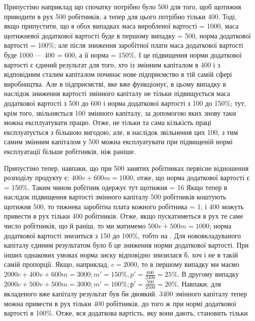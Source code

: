 
Припустімо наприклад що спочатку потрібно було 500 для того, щоб щотижня приводити в рух 500 робітників, а тепер для цього потрібно тільки
400.
Тоді, якщо припустити, що в обох випадках маса виробленої
вартості = 1000, маса щотижневої додаткової вартості буде в першому випадку = 500, норма додаткової вартості  = 100\%; але після зниження заробітної плати
маса додаткової вартості буде 1000 — 400 = 600, а її норма  = 150\%. І це підвищення норми додаткової вартості є єдиний результат
для того, хто із змінним капіталом в 400 і з відповідним сталим капіталом починає
нове підприємство в тій самій сфері виробництва. Але в підприємстві, яке вже функціонує, в цьому
випадку в наслідок зниження вартості змінного
капіталу не тільки підвищується маса додаткової вартості з 500
до 600 і норма додаткової вартості з 100
до 150\%; тут, крім того, звільняється 100
змінного капіталу, за допомогою яких знову таки можна експлуатувати працю. Отже, не тільки та сама
кількість праці експлуатується з більшою вигодою, але, в наслідок звільнення цих 100, з тим самим змінним капіталом у 500 можна експлуатувати при підвищеній
нормі експлуатації більше робітників, ніж раніше.

Припустімо тепер, навпаки, що при 500 занятих робітниках
первісне відношення розподілу продукту є: $400 v + 600 m = 1000$, отже, що норма додаткової вартості є = 150\%. Таким
чином робітник одержує тут щотижня  = 16 Якщо тепер в наслідок
підвищення вартості
змінного капіталу 500 робітників коштують щотижня 500, то тижнева заробітна плата кожного робітника = 1, і 400 можуть привести
в рух тільки 400 робітників. Отже, якщо пускатиметься в рух те
саме число робітників, що й раніш, то ми матимемо $500 v + 500 m = 1000$; норма додаткової вартості
знизиться з 150 до 100\%,
тобто на . Для нововкладуваного капіталу єдиним результатом було б це зниження норми додаткової
вартості. При інших
однакових умовах норма зиску відповідно знизилася б, хоч і не
в такій самій пропорції. Якщо, наприклад, $c = 2000$, то в
першому випадку ми маємо $2000 c + 400 v + 600 m = 3000; m' = 150\%, p' = \frac{600}{2400} = 25\%$. В другому
випадку $2000 c + 500 v + 500 m = 3000; m' = 100\%; р' = \frac{500}{2500} = 20\%$. Навпаки, для вкладеного вже
капіталу результат був би двоякий. 3400 змінного капіталу тепер можна привести в рух тільки
400 робітників, до того ж при нормі додаткової вартості в 100\%.
Отже, вся додаткова вартість, яку вони дають, становить тільки
\parbreak{}  %

